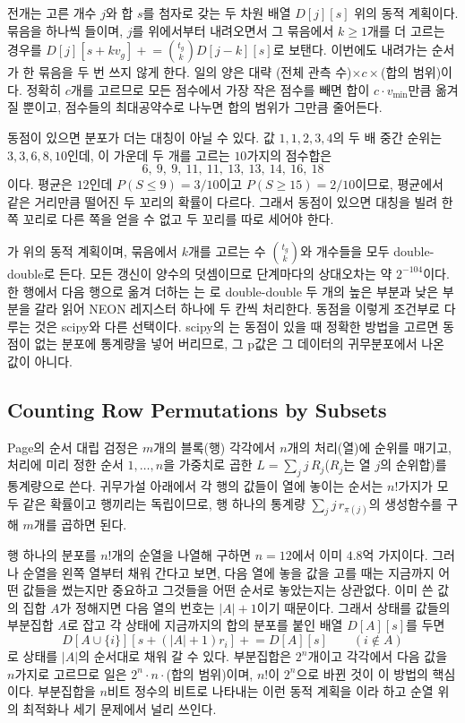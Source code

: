 전개는 고른 개수 $j$와 합 $s$를 첨자로 갖는 두 차원 배열 $D[j][s]$ 위의 동적 계획이다. 묶음을 하나씩 들이며, $j$를 위에서부터 내려오면서 그 묶음에서 $k\ge1$개를 더 고르는 경우를 $D[j][s+kv_g]\mathrel{+}=\binom{t_g}kD[j-k][s]$로 보탠다. 이번에도 내려가는 순서가 한 묶음을 두 번 쓰지 않게 한다. 일의 양은 대략 (전체 관측 수)$\times c\times$(합의 범위)이다. 정확히 $c$개를 고르므로 모든 점수에서 가장 작은 점수를 빼면 합이 $c\cdot v_{\min}$만큼 옮겨질 뿐이고, 점수들의 최대공약수로 나누면 합의 범위가 그만큼 줄어든다.

동점이 있으면 분포가 더는 대칭이 아닐 수 있다. 값 $1,1,2,3,4$의 두 배 중간 순위는 $3,3,6,8,10$인데, 이 가운데 두 개를 고르는 $10$가지의 점수합은
\[
6,\ 9,\ 9,\ 11,\ 11,\ 13,\ 13,\ 14,\ 16,\ 18
\]
이다. 평균은 $12$인데 $P(S\le9)=3/10$이고 $P(S\ge15)=2/10$이므로, 평균에서 같은 거리만큼 떨어진 두 꼬리의 확률이 다르다. 그래서 동점이 있으면 대칭을 빌려 한쪽 꼬리로 다른 쪽을 얻을 수 없고 두 꼬리를 따로 세어야 한다.

\begin{instardust}
가 위의 동적 계획이며, 묶음에서 $k$개를 고르는 수 $\binom{t_g}k$와 개수들을 모두 double-double로 든다. 모든 갱신이 양수의 덧셈이므로 단계마다의 상대오차는 약 $2^{-104}$이다. 한 행에서 다음 행으로 옮겨 더하는 는 로 double-double 두 개의 높은 부분과 낮은 부분을 갈라 읽어 NEON 레지스터 하나에 두 칸씩 처리한다. 동점을 이렇게 조건부로 다루는 것은 scipy와 다른 선택이다. scipy의 는 동점이 있을 때 정확한 방법을 고르면 동점이 없는 분포에 통계량을 넣어 버리므로, 그 p값은 그 데이터의 귀무분포에서 나온 값이 아니다.
\end{instardust}

\subsection{Counting Row Permutations by Subsets}

Page의 순서 대립 검정\cite{page1963}은 $m$개의 블록(행) 각각에서 $n$개의 처리(열)에 순위를 매기고, 처리에 미리 정한 순서 $1,\dots,n$을 가중치로 곱한 $L=\sum_jj\,R_j$($R_j$는 열 $j$의 순위합)를 통계량으로 쓴다. 귀무가설 아래에서 각 행의 값들이 열에 놓이는 순서는 $n!$가지가 모두 같은 확률이고 행끼리는 독립이므로, 행 하나의 통계량 $\sum_jj\,r_{\pi(j)}$의 생성함수를 구해 $m$개를 곱하면 된다.

행 하나의 분포를 $n!$개의 순열을 나열해 구하면 $n=12$에서 이미 $4.8$억 가지이다. 그러나 순열을 왼쪽 열부터 채워 간다고 보면, 다음 열에 놓을 값을 고를 때는 지금까지 어떤 값들을 썼는지만 중요하고 그것들을 어떤 순서로 놓았는지는 상관없다. 이미 쓴 값의 집합 $A$가 정해지면 다음 열의 번호는 $|A|+1$이기 때문이다. 그래서 상태를 값들의 부분집합 $A$로 잡고 각 상태에 지금까지의 합의 분포를 붙인 배열 $D[A][s]$를 두면
\[
D[A\cup\{i\}][s+(|A|+1)r_i]\mathrel{+}=D[A][s]\qquad(i\notin A)
\]
로 상태를 $|A|$의 순서대로 채워 갈 수 있다. 부분집합은 $2^n$개이고 각각에서 다음 값을 $n$가지로 고르므로 일은 $2^n\cdot n\cdot$(합의 범위)이며, $n!$이 $2^n$으로 바뀐 것이 이 방법의 핵심이다. 부분집합을 $n$비트 정수의 비트로 나타내는 이런 동적 계획을 이라 하고 순열 위의 최적화나 세기 문제에서 널리 쓰인다.

